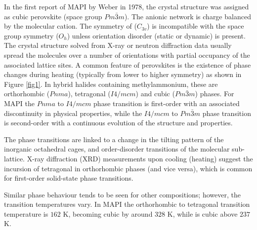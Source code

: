 In the first report of MAPI by Weber in 1978, the crystal structure was assigned as cubic perovskite (space group $Pm\bar{3}m$).\autocite{Weber1978,Weber1978a}
The anionic  network is charge balanced by the   molecular cation.
The symmetry of   ($C_{3v}$) is incompatible with the space group symmetry ($O_h$) unless orientation disorder (static or dynamic) is present.
The crystal structure solved from X-ray or neutron diffraction data usually spread the molecules over a number of orientations with partial occupancy of the associated lattice sites.
A common feature of perovskites is the existence of phase changes during heating (typically from lower to higher symmetry) as shown in Figure \ref{fig1}. 
In hybrid halides containing methylammonium, these are orthorhombic ($Pnma$), tetragonal ($I4/mcm$) and cubic ($Pm\bar{3}m$) phases.\autocite{Weller2015} 
%
For MAPI the $Pnma$ to $I4/mcm$ phase transition is first-order with an associated discontinuity in physical properties, while the $I4/mcm$ to $Pm\bar{3}m$ phase transition is second-order with a continuous evolution of the structure and properties.\autocite{Onoda-Yamamuro1990,Weller2015}

The phase transitions are linked to a change in the tilting pattern of the inorganic octahedral cages, and order-disorder transitions of the molecular sub-lattice.\autocite{Onoda-Yamamuro1990,Yamamuro1992a,Onoda-yamamuro1992}
X-ray diffraction (XRD) measurements upon cooling (heating) suggest the incursion of tetragonal in orthorhombic phases (and vice versa),\autocite{Hutter2016a}
which is common for first-order solid-state phase transitions. 

Similar phase behaviour tends to be seen for other compositions; however, the transition temperatures vary.
In MAPI the orthorhombic to tetragonal transition temperature is $162$ K, becoming cubic by around $328$ K,
while  is cubic above $237$ K.\autocite{Poglitsch1987c} 
%

